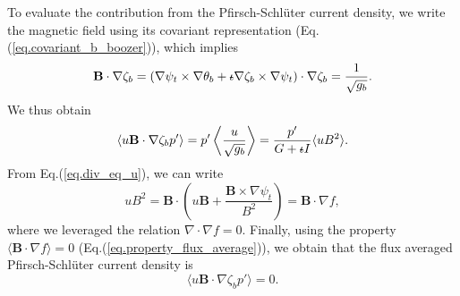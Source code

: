 \documentclass[my_thesis.tex]{subfiles}
\begin{document}
To evaluate the contribution from the Pfirsch-Schl\"uter current density, we write the magnetic field using its covariant representation (Eq.(\ref{eq.covariant_b_boozer})), which implies
\begin{equation}
	\mathbf{B}\cdot\nabla\zeta_b = (\nabla\psi_t\times\nabla\theta_b + \text{$\iota\!\!$-} \nabla\zeta_b\times\nabla\psi_t)\cdot\nabla\zeta_b = \frac{1}{\sqrt{g_b}}. \label{eq.B_dot_nabla_phi}
\end{equation}
We thus obtain
\begin{equation}
	\left\langle u\mathbf{B}\cdot\nabla\zeta_b p'\right\rangle = p' \left\langle \frac{u}{\sqrt {g_b}}\right\rangle = \frac{p'}{G+\text{$\iota\!\!$-} I}\langle uB^2 \rangle.
\end{equation}
From Eq.(\ref{eq.div_eq_u}), we can write
\begin{equation}
	uB^2 = \mathbf{B}\cdot\left(u\mathbf{B}+\frac{\mathbf{B}\times\nabla\psi_t}{B^2}\right) = \mathbf{B}\cdot\nabla f,
\end{equation}
where we leveraged the relation $\nabla\cdot\nabla f = 0$. Finally, using the property $\langle \mathbf{B}\cdot\nabla f\rangle = 0$ (Eq.(\ref{eq.property_flux_average})), we obtain that the flux averaged Pfirsch-Schl\"uter current density is
\begin{equation}
	\langle  u\mathbf{B}\cdot\nabla\zeta_b p'\rangle = 0.
\end{equation}
\end{document}
